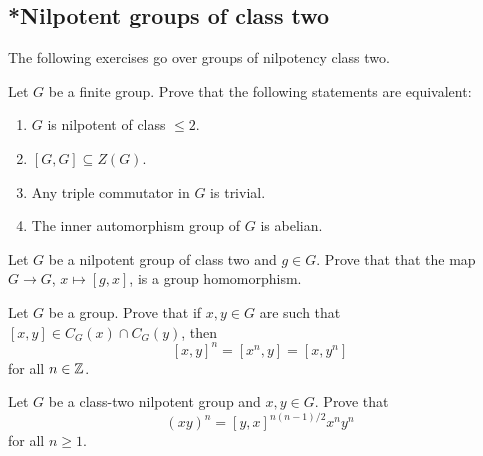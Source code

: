 \subsection{*Nilpotent groups of class two}

The following exercises go over groups 
of nilpotency class two. 

\begin{exercise}
    \label{xca:class2}
    Let $G$ be a finite group. Prove that the following statements are equivalent:
    \begin{enumerate}
        \item $G$ is nilpotent of class $\leq2$.
        \item $[G,G]\subseteq Z(G)$. 
        \item Any triple commutator in $G$ is trivial. 
        \item The inner automorphism group of $G$ is abelian. 
    \end{enumerate}
\end{exercise}

\begin{exercise}
    Let $G$ be a nilpotent group of class two and $g\in G$. Prove that
    that the map $G\to G$, $x\mapsto [g,x]$, is a group homomorphism. 
\end{exercise}

\begin{exercise}
\label{xca:commutador}
Let $G$ be a group. Prove that 
if $x,y\in G$ are such that $[x,y]\in C_G(x)\cap C_G(y)$, then 
\[
[x,y]^n=[x^n,y]=[x,y^n]
\]
for all $n\in\mathbb{Z}$.
\end{exercise}


\begin{exercise}[Hall]
\label{xca:Hall}
Let $G$ be a class-two nilpotent group and 
$x,y\in G$. Prove that 
\[
(xy)^n=[y,x]^{n(n-1)/2}x^ny^n
\]
for all $n\geq1$.
\end{exercise}

